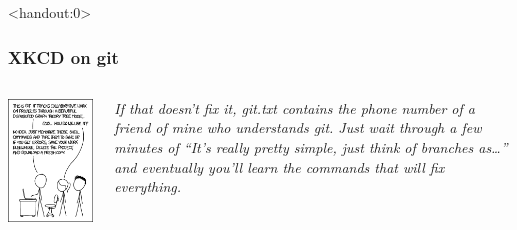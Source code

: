 \documentclass[10pt,svgnames,handout]{beamer}
\begin{document}
\begin{frame}<handout:0>
\label{xkcd_git}
\frametitle{XKCD on git \hfill\hyperlink{git_cons}{}}

\begin{columns}[T,onlytextwidth]
\includegraphics[width=\textwidth]{figures/xkcd-git.png}

\vfill
\emph{If that doesn't fix it, git.txt contains the phone number of a friend of mine who understands git.
Just wait through a few minutes of “It's really pretty simple, just think of branches as\ldots” and eventually you'll learn the commands that will fix everything.
}
\end{columns}
\end{frame}
\end{document}
